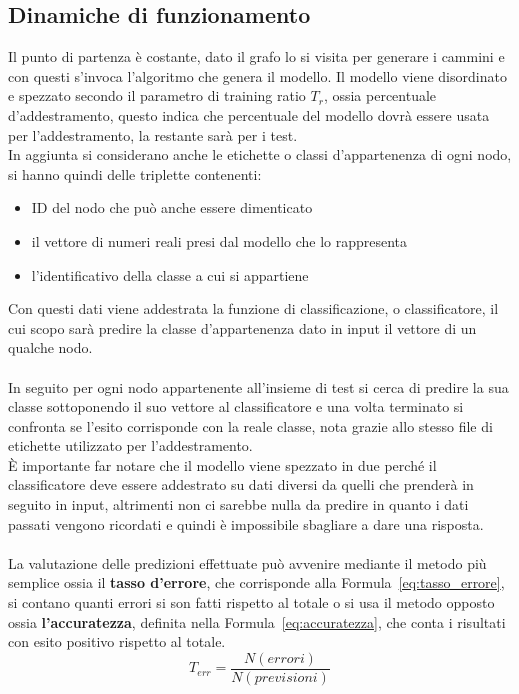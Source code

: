 \subsection{Dinamiche di funzionamento}
Il punto di partenza è costante, dato il grafo lo si visita per generare i cammini e con questi s'invoca l'algoritmo che genera il modello. Il modello viene disordinato e spezzato secondo il parametro di training ratio $T_r$, ossia percentuale d'addestramento, questo indica che percentuale del modello dovrà essere usata per l'addestramento, la restante sarà per i test.\\
In aggiunta si considerano anche le etichette o classi d'appartenenza di ogni nodo, si hanno quindi delle triplette contenenti:
\begin{itemize}
	\item ID del nodo che può anche essere dimenticato
	\item il vettore di numeri reali presi dal modello che lo rappresenta
	\item l'identificativo della classe a cui si appartiene
\end{itemize}
Con questi dati viene addestrata la funzione di classificazione, o classificatore, il cui scopo sarà predire la classe d'appartenenza dato in input il vettore di un qualche nodo.\\
\\
In seguito per ogni nodo appartenente all'insieme di test si cerca di predire la sua classe sottoponendo il suo vettore al classificatore e una volta terminato si confronta se l'esito corrisponde con la reale classe, nota grazie allo stesso file di etichette utilizzato per l'addestramento.\\
È importante far notare che il modello viene spezzato in due perché il classificatore deve essere addestrato su dati diversi da quelli che prenderà in seguito in input, altrimenti non ci sarebbe nulla da predire in quanto i dati passati vengono ricordati e quindi è impossibile sbagliare a dare una risposta.\\
\\
La valutazione delle predizioni effettuate può avvenire mediante il metodo più semplice ossia il \textbf{tasso d'errore}, che corrisponde alla Formula~\ref{eq:tasso_errore}, si contano quanti errori si son fatti rispetto al totale o si usa il metodo opposto ossia \textbf{l'accuratezza}, definita nella Formula~\ref{eq:accuratezza}, che conta i risultati con esito positivo rispetto al totale.
%
\begin{equation}
	T_{err} = \frac{N(errori)}{N(previsioni)}
	\label{eq:tasso_errore}
\end{equation}
